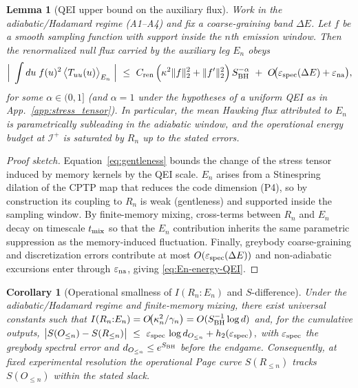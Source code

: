 \documentclass[11pt,a4paper]{article}
\theoremstyle{plain}
\newtheorem{lemma}[theorem]{Lemma}
\newtheorem{corollary}[theorem]{Corollary}
\theoremstyle{definition}
\theoremstyle{remark}
\begin{document}
\begin{lemma}[QEI upper bound on the auxiliary flux]\label{lem:En-energy-QEI}
Work in the adiabatic/Hadamard regime (A1--A4) and fix a coarse-graining band $\Delta E$. Let $f$ be a smooth sampling function with support inside the $n$th emission window. Then the renormalized null flux carried by the auxiliary leg $E_n$ obeys
\begin{equation}
\label{eq:En-energy-QEI}
\Big|\;\int du\; f(u)^2\,\big\langle T_{uu}(u)\big\rangle_{E_n}\;\Big|
\ \le\
 C_{\rm ren}\,\Big(\kappa^2 \|f\|_2^2 + \|f'\|_2^2\Big)\,S_{\rm BH}^{-\alpha}\ +\ O\!\big(\varepsilon_{\rm spec}(\Delta E)+\varepsilon_{\rm na}\big),
\end{equation}
for some $\alpha\in(0,1]$ (and $\alpha=1$ under the hypotheses of a uniform QEI as in App.~\ref{app:stress_tensor}). In particular, the mean Hawking flux attributed to $E_n$ is parametrically subleading in the adiabatic window, and the operational energy budget at $\mathscr{I}^+$ is saturated by $R_n$ up to the stated errors.
\end{lemma}
\begin{proof}[Proof sketch]
Equation~\eqref{eq:gentleness} bounds the change of the stress tensor induced by memory kernels by the QEI scale. $E_n$ arises from a Stinespring dilation of the CPTP map that reduces the code dimension (P4), so by construction its coupling to $R_n$ is weak (gentleness) and supported inside the sampling window. By finite-memory mixing, cross-terms between $R_n$ and $E_n$ decay on timescale $t_{\rm mix}$ so that the $E_n$ contribution inherits the same parametric suppression as the memory-induced fluctuation. Finally, greybody coarse-graining and discretization errors contribute at most $O(\varepsilon_{\rm spec}(\Delta E))$ and non-adiabatic excursions enter through $\varepsilon_{\rm na}$, giving \eqref{eq:En-energy-QEI}.
\end{proof}


\begin{corollary}[Operational smallness of $I(R_n{:}E_n)$ and $S$-difference]
\label{cor:En-small}
Under the adiabatic/Hadamard regime and finite-memory mixing, there exist universal constants such that
\(
I(R_n{:}E_n)=O\!\big(\kappa_n^2/\gamma_n\big)=O(S_{\rm BH}^{-1}\log d)
\)
and, for the cumulative outputs,
\(
\big|S(O_{\le n})-S(R_{\le n})\big| \ \le\ \varepsilon_{\rm spec}\,\log d_{O_{\le n}}+h_2(\varepsilon_{\rm spec})\,,
\)
with $\varepsilon_{\rm spec}$ the greybody spectral error and $d_{O_{\le n}}\le e^{S_{\rm BH}}$ before the endgame.
Consequently, at fixed experimental resolution the operational Page curve $S(R_{\le n})$ tracks $S(O_{\le n})$ within the stated slack.
\end{corollary}
\end{document}
